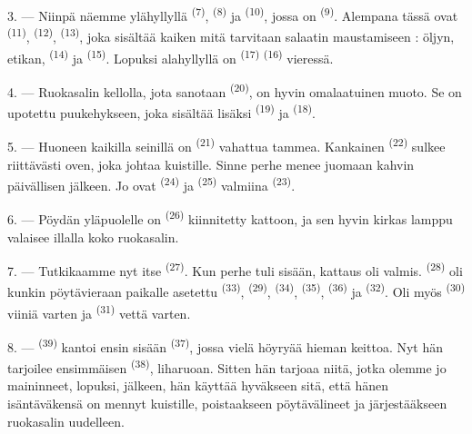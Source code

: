 3. --- Niinpä näemme ylähyllyllä  \textsuperscript{(7)},
 \textsuperscript{(8)} ja  \textsuperscript{(10)},
jossa on  \textsuperscript{(9)}. Alempana tässä ovat
 \textsuperscript{(11)},  \textsuperscript{(12)},
 \textsuperscript{(13)}, joka sisältää kaiken mitä tarvitaan
salaatin maustamiseen : öljyn, etikan,  \textsuperscript{(14)} ja
 \textsuperscript{(15)}. Lopuksi alahyllyllä on 
\textsuperscript{(17)}  \textsuperscript{(16)} vieressä.

4. --- Ruokasalin kellolla, jota sanotaan 
\textsuperscript{(20)}, on hyvin omalaatuinen muoto. Se on upotettu
puukehykseen, joka sisältää lisäksi 
\textsuperscript{(19)} ja  \textsuperscript{(18)}.

\VUsaut{4.6mm}
\VUsaut{3.0mm}

5. --- Huoneen kaikilla seinillä on 
\textsuperscript{(21)} vahattua tammea. Kankainen 
\textsuperscript{(22)} sulkee riittävästi oven, joka johtaa kuistille. Sinne
perhe menee juomaan kahvin päivällisen jälkeen. Jo ovat 
\textsuperscript{(24)} ja  \textsuperscript{(25)} valmiina
 \textsuperscript{(23)}.

6. --- Pöydän yläpuolelle on  \textsuperscript{(26)}
kiinnitetty kattoon, ja sen hyvin kirkas lamppu valaisee illalla koko
ruokasalin.

7. --- Tutkikaamme nyt itse  \textsuperscript{(27)}. Kun
perhe tuli sisään, kattaus oli valmis. 
\textsuperscript{(28)} oli kunkin pöytävieraan paikalle asetettu
 \textsuperscript{(33)}, 
\textsuperscript{(29)},  \textsuperscript{(34)},
 \textsuperscript{(35)}, 
\textsuperscript{(36)} ja  \textsuperscript{(32)}. Oli myös
 \textsuperscript{(30)} viiniä varten ja 
\textsuperscript{(31)} vettä varten.

8. ---  \textsuperscript{(39)} kantoi ensin sisään
 \textsuperscript{(37)}, jossa vielä höyryää hieman keittoa.
Nyt hän tarjoilee ensimmäisen  \textsuperscript{(38)},
liharuoan. Sitten hän tarjoaa niitä, jotka olemme jo maininneet, lopuksi,
 jälkeen, hän käyttää hyväkseen sitä, että hänen
isäntäväkensä on mennyt kuistille, poistaakseen pöytävälineet ja järjestääkseen
ruokasalin uudelleen.

